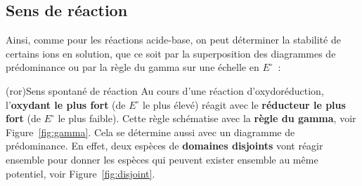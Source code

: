 \documentclass[../../main/main.tex]{subfiles}
\begin{document}
\subsection{Sens de réaction}
Ainsi, comme pour les réactions acide-base, on peut déterminer la stabilité de
certains ions en solution, que ce soit par la superposition des diagrammes de
prédominance ou par la règle du gamma sur une échelle en $E^\circ$~:

\begin{tcb*}[sidebyside, righthand ratio=.25](ror){Sens spontané de réaction}
  Au cours d'une réaction d'oxydoréduction, l'\textbf{oxydant le plus fort} (de
  $E^\circ$ le plus élevé) réagit avec le \textbf{réducteur le plus fort} (de
  $E^\circ$ le plus faible). Cette règle schématise avec la \textbf{règle du
  gamma}, voir Figure~\ref{fig:gamma}.
  \smallbreak
  Cela se détermine aussi avec un diagramme de
  prédominance. En effet, deux espèces de \textbf{domaines disjoints} vont
  réagir ensemble pour donner les espèces qui peuvent exister ensemble au même
  potentiel, voir Figure~\ref{fig:disjoint}.
  \begin{center}
    \vspace{-15pt}
    \label{fig:disjoint}
  \end{center}
  \tcblower
  \begin{center}
    \sswitch{
}
\end{center}
\end{tcb*}
\end{document}
